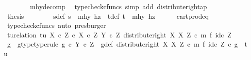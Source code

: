 \begin{isabellebody}
\ \ \ \ \ \ \isamarkupfalse%
\ mhy{\isacharunderscore}{\kern0pt}decomp\ \isamarkupfalse%
\ {\isacharparenleft}{\kern0pt}typecheck{\isacharunderscore}{\kern0pt}cfuncs{\isacharcomma}{\kern0pt}\ simp\ add{\isacharcolon}{\kern0pt}\ distribute{\isacharunderscore}{\kern0pt}right{\isacharunderscore}{\kern0pt}ap{\isacharparenright}{\kern0pt}\isanewline
\ \ \ \ \isamarkupfalse%
\ \isamarkupfalse%
\ {\isacharquery}{\kern0pt}thesis\isacommand{{\isachardot}{\kern0pt}}\isamarkupfalse%
\isanewline
\ \ \isamarkupfalse%
\isanewline
\ \ \isamarkupfalse%
\ \isamarkupfalse%
\ s{\isacharunderscore}{\kern0pt}def{\isacharcolon}{\kern0pt}\ {\isachardoublequoteopen}s\ {\isacharequal}{\kern0pt}\ {\isasymlangle}mhy{}{\isacharcomma}{\kern0pt}\ hz{\isasymrangle}{\isachardoublequoteclose}\ \ t{\isacharunderscore}{\kern0pt}def{\isacharcolon}{\kern0pt}\ {\isachardoublequoteopen}t\ {\isacharequal}{\kern0pt}\ {\isasymlangle}mhy{}{\isacharcomma}{\kern0pt}\ hz{\isasymrangle}{\isachardoublequoteclose}\isanewline
\ \ \ \ \isamarkupfalse%
\ cart{\isacharunderscore}{\kern0pt}prod{\isacharunderscore}{\kern0pt}eq{}\ \isamarkupfalse%
\ {\isacharparenleft}{\kern0pt}typecheck{\isacharunderscore}{\kern0pt}cfuncs{\isacharcomma}{\kern0pt}\ auto{\isacharcomma}{\kern0pt}\ presburger{\isacharparenright}{\kern0pt}\isanewline
\isanewline
\ \ \isamarkupfalse%
\ tu{\isacharunderscore}{\kern0pt}relation{\isacharcolon}{\kern0pt}\ {\isachardoublequoteopen}{\isasymlangle}t{\isacharcomma}{\kern0pt}u{\isasymrangle}\ {\isasymin}\isactrlbsub {\isacharparenleft}{\kern0pt}X\ {\isasymtimes}\isactrlsub c\ Z{\isacharparenright}{\kern0pt}\ {\isasymtimes}\isactrlsub c\ X\ {\isasymtimes}\isactrlsub c\ Z\isactrlesub \ {\isacharparenleft}{\kern0pt}Y\ {\isasymtimes}\isactrlsub c\ Z{\isacharcomma}{\kern0pt}\ distribute{\isacharunderscore}{\kern0pt}right\ X\ X\ Z\ {\isasymcirc}\isactrlsub c\ m\ {\isasymtimes}\isactrlsub f\ id\isactrlsub c\ Z{\isacharparenright}{\kern0pt}{\isachardoublequoteclose}\isanewline
\ \ \isamarkupfalse%
\ \isamarkupfalse%
\ g\ \ g{\isacharunderscore}{\kern0pt}type{\isacharbrackleft}{\kern0pt}type{\isacharunderscore}{\kern0pt}rule{\isacharbrackright}{\kern0pt}{\isacharcolon}{\kern0pt}\ {\isachardoublequoteopen}g\ {\isasymin}\isactrlsub c\ Y\ {\isasymtimes}\isactrlsub c\ Z{\isachardoublequoteclose}\ \ g{\isacharunderscore}{\kern0pt}def{\isacharcolon}{\kern0pt}\ {\isachardoublequoteopen}{\isacharparenleft}{\kern0pt}distribute{\isacharunderscore}{\kern0pt}right\ X\ X\ Z\ {\isasymcirc}\isactrlsub c\ m\ {\isasymtimes}\isactrlsub f\ id\isactrlsub c\ Z{\isacharparenright}{\kern0pt}\ {\isasymcirc}\isactrlsub c\ g\ {\isacharequal}{\kern0pt}\ {\isasymlangle}t{\isacharcomma}{\kern0pt}u{\isasymrangle}{\isachardoublequoteclose}\isanewline

\end{isabellebody}
